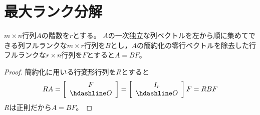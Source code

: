     \section{最大ランク分解}
        \begin{shadebox}
            $m\times n$行列$A$の階数を$r$とする。
            $A$の一次独立な列ベクトルを左から順に集めてできる列フルランクな$m\times r$行列を$B$とし，$A$の簡約化の零行ベクトルを除去した行フルランクな$r\times n$行列を$F$とすると$A = BF$。
        \end{shadebox}
        \begin{proof}
            \quad\par
            簡約化に用いる行変形行列を$R$とすると
            \[
                RA = \left[
                \begin{array}{c}
                    F \\ \hdashline
                    O
                \end{array}
                \right]
                =
                \left[
                \begin{array}{c}
                    I_r \\ \hdashline
                    O
                \end{array}
                \right]
                F = RBF
            \]
            $R$は正則だから$A = BF$。
        \end{proof}